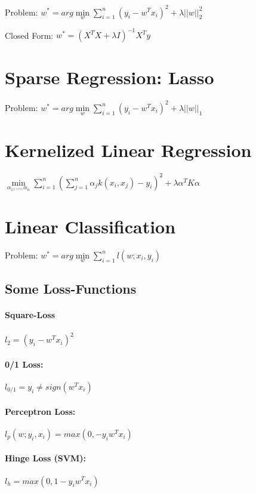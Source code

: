 \documentclass[11pt,twocolumn]{article}
\begin{document}
Problem: $ w^* =  arg \min \limits_w \sum \limits_{i=1}^n \left(y_i - w^Tx_i\right)^2 + \lambda ||w||_2^2$

Closed Form: $w^* = \left(X^T X + \lambda I \right)^{-1} X^T y$

\section{Sparse Regression: Lasso}

Problem: $ w^* =  arg \min \limits_w \sum \limits_{i=1}^n \left(y_i - w^Tx_i\right)^2 + \lambda ||w||_1$


\section{Kernelized Linear Regression}

$\min \limits_{\alpha_1,...,\alpha_n} \sum \limits_{i=1}^n\left( \sum \limits_{j=1}^n \alpha_j k(x_i,x_j) - y_i \right)^2 + \lambda \alpha^T K \alpha$

\section{Linear Classification}

Problem: $ w^* =  arg \min \limits_w \sum \limits_{i=1}^n l\left(w;x_i,y_i\right)$


\subsection{Some Loss-Functions}
\paragraph{Square-Loss} $l_2 = (y_i - w^T x_i)^2$

\paragraph{0/1 Loss:} $ l_{0/1}  =  y_i \neq sign(w^Tx_i)$

\paragraph{Perceptron Loss:} $l_p\left(w;y_i,x_i \right) =   max(0, -y_i w^T x_i)$

\paragraph{Hinge Loss (SVM):} $l_h =   max(0, 1 -y_i w^T x_i)$
\end{document}
